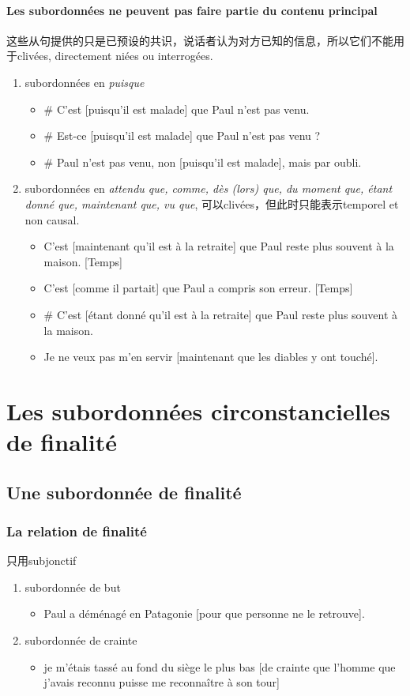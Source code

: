 \documentclass[UTF8]{report}
\begin{document}
\paragraph{Les subordonnées ne peuvent pas faire partie du contenu principal}
这些从句提供的只是已预设的共识，说话者认为对方已知的信息，所以它们不能用于clivées, directement niées ou interrogées.
\begin{enumerate}
    \item subordonnées en \textit{puisque}
    \begin{itemize}
        \item \# C’est [puisqu’il est malade] que Paul n’est pas venu.
        \item \# Est-ce [puisqu’il est malade] que Paul n’est pas venu ?
        \item \# Paul n’est pas venu, non [puisqu’il est malade], mais par oubli.
    \end{itemize}
    \item subordonnées en \textit{attendu que, comme, dès (lors) que, du moment que, étant donné que, maintenant que, vu que}, 可以clivées，但此时只能表示temporel et non causal.
    \begin{itemize}
        \item C’est [maintenant qu’il est à la retraite] que Paul reste plus souvent à la maison. [Temps]
        \item C’est [comme il partait] que Paul a compris son erreur. [Temps]
        \item \# C’est [étant donné qu’il est à la retraite] que Paul reste plus souvent à la maison.
        \item Je ne veux pas m’en servir [maintenant que les diables y ont touché]. 
    \end{itemize}
\end{enumerate}


\section{Les subordonnées circonstancielles de finalité}
\subsection{Une subordonnée de finalité}
\subsubsection{La relation de finalité}
只用subjonctif
\begin{enumerate}
    \item subordonnée de but
    \begin{itemize}
        \item Paul a déménagé en Patagonie [pour que personne ne le retrouve].
    \end{itemize}
    \item subordonnée de crainte
    \begin{itemize}
        \item je m’étais tassé au fond du siège le plus bas [de crainte que l’homme que j’avais reconnu puisse me reconnaître à son tour]
    \end{itemize}
\end{enumerate}
\end{document}

